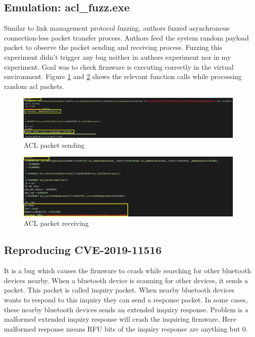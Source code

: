 \documentclass[letterpaper,11pt]{article}
\begin{document}
\subsection{Emulation: acl\_fuzz.exe} 
Similar to link management protocol fuzzing, authors fuzzed asynchronous connection-less packet transfer process. Authors feed the system random payload packet to observe the packet sending and receiving process. Fuzzing this experiment didn't trigger any bug neither in authors experiment nor in my experiment. Goal was to check firmware is executing correctly in the virtual environment. Figure \ref{fig:aclSending} and \ref{fig:aclReceiving} shows the relevant function calls while processing random acl packets. 
\begin{figure}
    \centering
    \includegraphics[width=\textwidth]{images/acl_Send_data.png}      \caption{ACL packet sending}
    \label{fig:aclSending}
\end{figure}
\begin{figure}
    \centering
    \includegraphics[width=\textwidth]{images/acl_receive_data.png}      \caption{ACL packet receiving}
    \label{fig:aclReceiving}
\end{figure}

\subsection{Reproducing CVE-2019-11516}
It is a bug which causes the firmware to crash while searching for other bluetooth devices nearby. When a bluetooth device is scanning for other devices, it sends a packet. This packet is called inquiry packet. When nearby bluetooth devices wants to respond to this inquiry they can send a response packet. In some cases, these nearby bluetooth devices sends an extended inquiry response. Problem is a malformed extended inquiry response will crash the inquiring firmware. Here malformed response means RFU bits of the inquiry response are anything but 0. 
\end{document}
